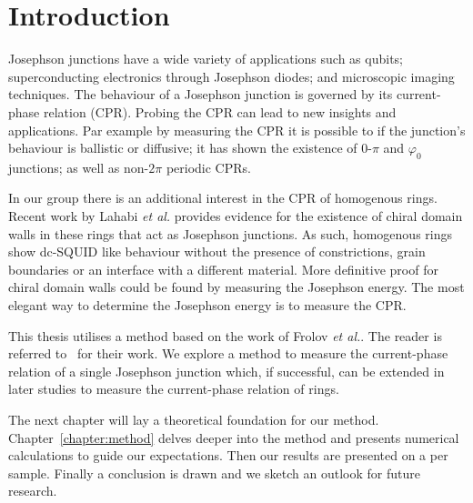 \chapter{Introduction}
Josephson junctions have a wide variety of applications such as qubits\cite{placeNewMaterialPlatform2021,pechenezhskiySuperconductingQuasichargeQubit2020}; superconducting electronics through Josephson diodes\cite{zhangReconfigurableMagneticfieldfreeSuperconducting2023a,ciacciaGateTunableJosephson2023}; and microscopic imaging techniques\cite{clarkeSQUIDHandbook2004,rogSQUIDontipMagneticMicroscopy2022,pranceSensitivityDCSQUID2023}. The behaviour of a Josephson junction is governed by its current-phase relation (CPR). Probing the CPR can lead to new insights and applications. Par example by measuring the CPR it is possible to if the junction's behaviour is ballistic or diffusive\cite{endresCurrentPhaseRelation2023,kayyalhaHighlySkewedCurrent2020}; it has shown the existence of $0$-$\pi$ and $\varphi_0$ junctions\cite{frolovMeasurementCurrentPhaseRelation2004,muraniBallisticEdgeStates2017,strambiniJosephsonPhaseBattery2020,szombatiJosephsonPh0junctionNanowire2016}; as well as non-$2\pi$ periodic CPRs\cite{endresCurrentPhaseRelation2023}.

In our group there is an additional interest in the CPR of homogenous  rings. Recent work by Lahabi \textit{et al.} provides evidence for the existence of chiral domain walls in these rings that act as Josephson junctions.\cite{lahabiSpintripletSupercurrentsOdd2018} As such, homogenous  rings show dc-SQUID like behaviour without the presence of constrictions, grain boundaries or an interface with a different material. More definitive proof for chiral domain walls could be found by measuring the Josephson energy.\cite{lahabiSpintripletSupercurrentsOdd2018,sigristRoleDomainWalls1999} The most elegant way to determine the Josephson energy is to measure the CPR.

This thesis utilises a method based on the work of Frolov \textit{et al.}. The reader is referred to~\cite{frolovMeasurementCurrentPhaseRelation2004,frolovCurrentphaseRelationsJosephson2005} for their work. We explore a method to measure the current-phase relation of a single Josephson junction which, if successful, can be extended in later studies to measure the current-phase relation of  rings.

The next chapter will lay a theoretical foundation for our method. Chapter~\ref{chapter:method} delves deeper into the method and presents numerical calculations to guide our expectations. Then our results are presented on a per sample. Finally a conclusion is drawn and we sketch an outlook for future research.